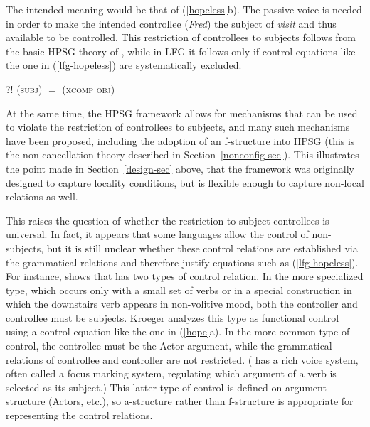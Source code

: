 \begin{exe} 
\ex 
\label{hopeless}
\begin{xlist}
\end{xlist}
\end{exe}
The intended meaning would be that of (\ref{hopeless}b).  The passive voice is needed in order to make the intended controllee (\textit{Fred})  the subject of \textit{visit} and thus available to be controlled.  This restriction of controllees to subjects follows from the basic HPSG theory of \citet[132-145]{ps2}, while in LFG it follows only if control equations like the one in (\ref{lfg-hopeless}) are systematically excluded.
\begin{exe} 
\ex 
\label{lfg-hopeless}
 {?! (\up \textsc{subj})  $=$  (\up \textsc{xcomp} \textsc{obj})}
\end{exe}
At the same time, the HPSG framework allows for mechanisms that can be used to violate the restriction of controllees to subjects, and many such mechanisms have been proposed, including the adoption of an f-structure into HPSG (this is the non-cancellation theory described in Section~\ref{nonconfig-sec}).  This illustrates the point made in Section~\ref{design-sec} above, that the framework was originally designed to capture locality conditions, but is flexible enough to capture non-local relations as well.  

This raises the question of whether the restriction to subject controllees is universal.  In fact, it appears that some languages allow the control of non-subjects, but it is still unclear whether these control relations are established via the grammatical relations and therefore justify equations such as (\ref{lfg-hopeless}).  For instance,   \citet{kroeger:1993} shows that  has two types of control relation.  In the more specialized type, which occurs only with a small set of verbs or in a special construction in which the downstairs verb appears in non-volitive mood, both the controller and controllee must be subjects.  
Kroeger analyzes this type as functional control using a control equation like the one in (\ref{hope}a).  In the more common type of  control, the controllee must be the Actor argument, while the grammatical relations of controllee and controller are not restricted.  ( has a rich voice system, often called a focus marking system, regulating which argument of a verb is selected as its subject.)  
This latter type of  control is defined on argument structure (Actors, etc.), so a-structure rather than f-structure is appropriate for representing the control relations.    

